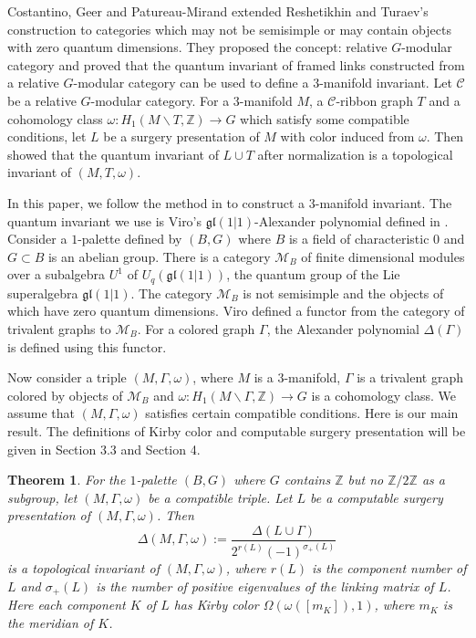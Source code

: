 \documentclass[12pt]{amsart}
\newtheorem{theo}{Theorem}[section]
\begin{document}
Costantino, Geer and Patureau-Mirand \cite{MR3286896} extended Reshetikhin and Turaev's construction to categories which may not be semisimple or may contain objects with zero quantum dimensions. They proposed the concept: relative $G$-modular category and proved that the quantum invariant of framed links constructed from a relative $G$-modular category can be used to define a $3$-manifold invariant. Let $\mathscr{C}$ be a relative $G$-modular category. For a $3$-manifold $M$, a $\mathscr{C}$-ribbon graph $T$ and a cohomology class $\omega: H_1(M\backslash T, \mathbb{Z})\to G$ which satisfy some compatible conditions, let $L$ be a surgery presentation of $M$ with color induced from $\omega$. Then \cite{MR3286896} showed that the quantum invariant of $L\cup T$ after normalization is a topological invariant of $(M, T, \omega)$.

In this paper, we follow the method in \cite{MR3286896} to construct a $3$-manifold invariant. The quantum invariant we use is Viro's $\mathfrak{gl}(1\vert 1)$-Alexander polynomial defined in \cite{MR2255851}. Consider a $1$-palette defined by $(B, G)$ where $B$ is a field of characteristic $0$ and $G\subset B$ is an abelian group. There is a category $\mathcal{M}_B$ of finite dimensional modules over a subalgebra $U^1$ of  $U_{q}(\mathfrak{gl}(1 \vert 1))$, the quantum group of the Lie superalgebra $\mathfrak{gl}(1 \vert 1)$. The category $\mathcal{M}_B$ is not semisimple and the objects of which have zero quantum dimensions. Viro defined a functor from the category of trivalent graphs to $\mathcal{M}_B$. For a colored graph $\Gamma$, the Alexander polynomial $\Delta (\Gamma)$ is defined using this functor. 

Now consider a triple $(M, \Gamma, \omega)$, where $M$ is a $3$-manifold, $\Gamma$ is a trivalent graph colored by objects of $\mathcal{M}_B$ and $\omega: H_1(M\backslash \Gamma, \mathbb{Z})\to G$ is a cohomology class. We assume that $(M, \Gamma, \omega)$ satisfies certain compatible conditions. Here is our main result. The definitions of Kirby color and computable surgery presentation will be given in Section 3.3 and Section 4.

\begin{theo} 
\label{mainresult1}
For the $1$-palette $(B, G)$ where $G$ contains $\mathbb{Z}$ but no $\mathbb{Z}/2\mathbb{Z}$ as a subgroup, let $(M, \Gamma, \omega)$ be a compatible triple. Let $L$ be a computable surgery presentation of $(M, \Gamma, \omega)$. Then  
$$\Delta (M, \Gamma, \omega):=\frac{\Delta (L\cup \Gamma)}{2^{r(L)}(-1)^{\sigma_{+}(L)}}$$
is a topological invariant of $(M, \Gamma, \omega)$, where $r(L)$ is the component number of $L$ and $\sigma_{+}(L)$ is the number of positive eigenvalues of the linking matrix of $L$. Here each component $K$ of $L$ has Kirby color $\Omega(\omega([m_K]), 1)$, where $m_K$ is the meridian of $K$. 
\end{theo}
\end{document}
